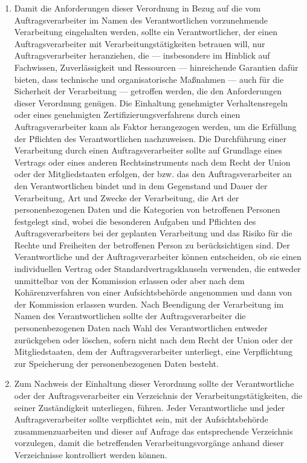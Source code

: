 \begin{enumerate}

   \item Damit die Anforderungen dieser Verordnung in Bezug auf die vom Auftragsverarbeiter im Namen des
    Verantwortlichen vorzunehmende Verarbeitung eingehalten werden, sollte ein Verantwortlicher, der einen
    Auftragsverarbeiter mit Verarbeitungstätigkeiten betrauen will, nur Auftragsverarbeiter heranziehen, die —
    insbesondere im Hinblick auf Fachwissen, Zuverlässigkeit und Ressourcen — hinreichende Garantien dafür bieten, dass
    technische und organisatorische Maßnahmen — auch für die Sicherheit der Verarbeitung — getroffen werden, die den
    Anforderungen dieser Verordnung genügen. Die Einhaltung genehmigter Verhaltensregeln oder eines genehmigten
    Zertifizierungsverfahrens durch einen Auftragsverarbeiter kann als Faktor herangezogen werden, um die Erfüllung der
    Pflichten des Verantwortlichen nachzuweisen. Die Durchführung einer Verarbeitung durch einen Auftragsverarbeiter
    sollte auf Grundlage eines Vertrags oder eines anderen Rechtsinstruments nach dem Recht der Union oder der
    Mitgliedstaaten erfolgen, der bzw. das den Auftragsverarbeiter an den Verantwortlichen bindet und in dem Gegenstand
    und Dauer der Verarbeitung, Art und Zwecke der Verarbeitung, die Art der personenbezogenen Daten und die Kategorien
    von betroffenen Personen festgelegt sind, wobei die besonderen Aufgaben und Pflichten des Auftragsverarbeiters bei
    der geplanten Verarbeitung und das Risiko für die Rechte und Freiheiten der betroffenen Person zu berücksichtigen
    sind. Der Verantwortliche und der Auftragsverarbeiter können entscheiden, ob sie einen individuellen Vertrag oder
    Standardvertragsklauseln verwenden, die entweder unmittelbar von der Kommission erlassen oder aber nach dem
    Kohärenzverfahren von einer Aufsichtsbehörde angenommen und dann von der Kommission erlassen wurden. Nach
    Beendigung der Verarbeitung im Namen des Verantwortlichen sollte der Auftragsverarbeiter die personenbezogenen
    Daten nach Wahl des Verantwortlichen entweder zurückgeben oder löschen, sofern nicht nach dem Recht der Union oder
    der Mitgliedstaaten, dem der Auftragsverarbeiter unterliegt, eine Verpflichtung zur Speicherung der
    personenbezogenen Daten besteht.%
   \label{eg:81}
   

   \item Zum Nachweis der Einhaltung dieser Verordnung sollte der Verantwortliche oder der Auftragsverarbeiter ein
    Verzeichnis der Verarbeitungstätigkeiten, die seiner Zuständigkeit unterliegen, führen. Jeder Verantwortliche und
    jeder Auftragsverarbeiter sollte verpflichtet sein, mit der Aufsichtsbehörde zusammenzuarbeiten und dieser auf
    Anfrage das entsprechende Verzeichnis vorzulegen, damit die betreffenden Verarbeitungsvorgänge anhand dieser
    Verzeichnisse kontrolliert werden können.%
   \label{eg:82}
   

\end{enumerate}
